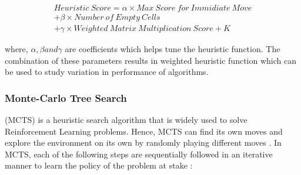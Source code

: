 \documentclass{svproc}
\begin{document}
    \begin{multline*} \label{heuristic_score_equation}
    Heuristic \ Score  = \alpha \times Max \ Score \ for \  Immidiate \ Move \\
    + \beta \times Number \ of \ Empty \  Cells \\
    + \gamma \times Weighted \ Matrix \ Multiplication \ Score  + K
    \end{multline*}

    where, \(\alpha ,  \beta and  \gamma \) are coefficients which helps tune the heuristic function.
    The combination of these parameters results in weighted heuristic function which can be used to study variation in performance of algorithms.



    \subsubsection{Monte-Carlo Tree Search}

    (MCTS) is a heuristic search algorithm that is widely used to solve Reinforcement Learning problems. Hence, MCTS can find its own moves and explore the environment on its own by randomly playing different moves \cite{mcts_comparison}. In MCTS, each of the following steps are sequentially followed in an iterative manner to learn the policy of the problem at stake \cite{mcts_medium}:
\end{document}
